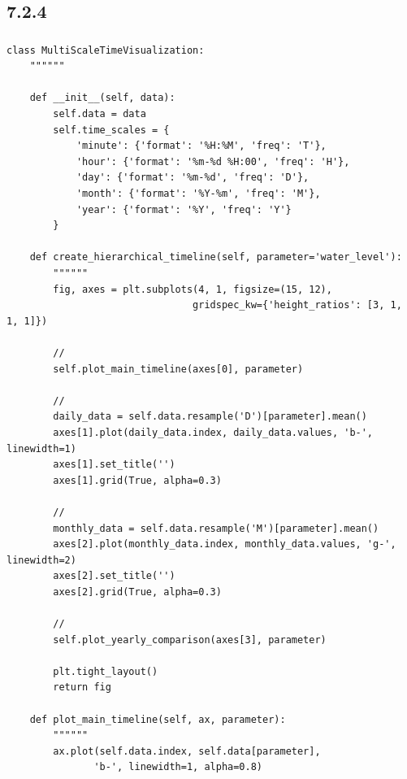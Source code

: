 \hypertarget{section-125}{%
\subsection{7.2.4}\label{section-125}}

\hypertarget{section-126}{%
\subsubsection{}\label{section-126}}

\hypertarget{section-127}{%
\paragraph{}\label{section-127}}

\begin{lstlisting}[style=python]
class MultiScaleTimeVisualization:
    """"""
    
    def __init__(self, data):
        self.data = data
        self.time_scales = {
            'minute': {'format': '%H:%M', 'freq': 'T'},
            'hour': {'format': '%m-%d %H:00', 'freq': 'H'},
            'day': {'format': '%m-%d', 'freq': 'D'},
            'month': {'format': '%Y-%m', 'freq': 'M'},
            'year': {'format': '%Y', 'freq': 'Y'}
        }
    
    def create_hierarchical_timeline(self, parameter='water_level'):
        """"""
        fig, axes = plt.subplots(4, 1, figsize=(15, 12), 
                                gridspec_kw={'height_ratios': [3, 1, 1, 1]})
        
        // 
        self.plot_main_timeline(axes[0], parameter)
        
        // 
        daily_data = self.data.resample('D')[parameter].mean()
        axes[1].plot(daily_data.index, daily_data.values, 'b-', linewidth=1)
        axes[1].set_title('')
        axes[1].grid(True, alpha=0.3)
        
        // 
        monthly_data = self.data.resample('M')[parameter].mean()
        axes[2].plot(monthly_data.index, monthly_data.values, 'g-', linewidth=2)
        axes[2].set_title('')
        axes[2].grid(True, alpha=0.3)
        
        // 
        self.plot_yearly_comparison(axes[3], parameter)
        
        plt.tight_layout()
        return fig
    
    def plot_main_timeline(self, ax, parameter):
        """"""
        ax.plot(self.data.index, self.data[parameter], 
               'b-', linewidth=1, alpha=0.8)
        

\end{lstlisting}
